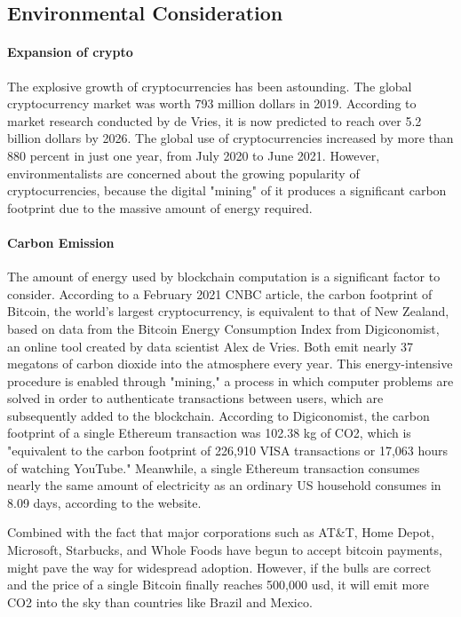 \documentclass[10pt,twocolumn]{article}
\begin{document}
\subsection{Environmental Consideration}
\paragraph{Expansion of crypto}

The explosive growth of cryptocurrencies has been astounding. The global cryptocurrency market was worth 793 million dollars in 2019. According to market research conducted by de Vries, it is now predicted to reach over 5.2 billion dollars by 2026. The global use of cryptocurrencies increased by more than 880 percent in just one year, from July 2020 to June 2021. However, environmentalists are concerned about the growing popularity of cryptocurrencies, because the digital "mining" of it produces a significant carbon footprint due to the massive amount of energy required.

\paragraph{Carbon Emission}

The amount of energy used by blockchain computation is a significant factor to consider. According to a February 2021 CNBC article, the carbon footprint of Bitcoin, the world's largest cryptocurrency, is equivalent to that of New Zealand, based on data from the Bitcoin Energy Consumption Index from Digiconomist, an online tool created by data scientist Alex de Vries. Both emit nearly 37 megatons of carbon dioxide into the atmosphere every year. This energy-intensive procedure is enabled through "mining," a process in which computer problems are solved in order to authenticate transactions between users, which are subsequently added to the blockchain.
According to Digiconomist, the carbon footprint of a single Ethereum transaction was 102.38 kg of CO2, which is "equivalent to the carbon footprint of 226,910 VISA transactions or 17,063 hours of watching YouTube." Meanwhile, a single Ethereum transaction consumes nearly the same amount of electricity as an ordinary US household consumes in 8.09 days, according to the website.

Combined with the fact that major corporations such as AT&T, Home Depot, Microsoft, Starbucks, and Whole Foods have begun to accept bitcoin payments, might pave the way for widespread adoption. However, if the bulls are correct and the price of a single Bitcoin finally reaches 500,000 usd, it will emit more CO2 into the sky than countries like Brazil and Mexico.
\end{document}
